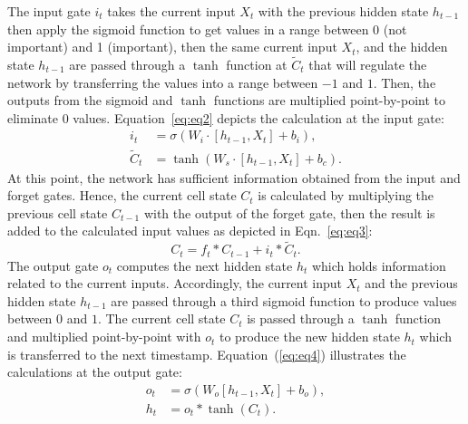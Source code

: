The input gate \(i_{t}\) takes the current input \(X_t\) with the previous hidden state \(h_{t-1}\) then apply the sigmoid function to get values in a range between 0 (not important) and 1 (important), then the
same current input \(X_t\), and the hidden state \(h_{t-1}\) are passed through a \(\tanh\) function at \(\tilde{C}_{t}\) that will regulate the network by transferring the values into a range between \(-1\) and \(1\).
Then, the outputs from the sigmoid and \(\tanh\) functions are multiplied point-by-point to eliminate \(0\) values.  
Equation~\ref{eq:eq2} depicts the calculation at the input gate:
\begin{equation}
	\begin{aligned}
		i_{t} &=\sigma\left(W_{i} \cdot\left[h_{t-1}, X_{t}\right]+b_{i}\right) ,
		\\
		\tilde{C}_{t} &=\tanh \left(W_{s} \cdot\left[h_{t-1}, X_{t}\right]+b_{c}\right).
	\end{aligned} \label{eq:eq2}
\end{equation}
At this point, the network has sufficient information obtained from the input and forget gates. 
Hence, the current cell state \(C_t\) is calculated by multiplying the previous cell state \(C_{t-1}\) with the output of the forget gate, then the result is added to the calculated input values as depicted in Eqn.~\ref{eq:eq3}:
\begin{equation}
	C_{t}=f_{t} * C_{t-1}+i_{t} * \tilde{C}_{t}.
	\label{eq:eq3}
\end{equation}
The output gate \(o_{t}\) computes the next hidden state \(h_{t}\) which
holds information related to the current inputs. 
Accordingly, the current input \(X_{t}\) and the previous hidden state \(h_{t-1}\) are passed through a third sigmoid function to produce values between \(0\) and \(1\).
The current cell state \(C_{t}\) is passed through a \(\tanh\) function and multiplied point-by-point with \(o_{t}\) to produce the new hidden state \(h_{t}\) which is transferred to the next timestamp.
Equation~(\ref{eq:eq4}) illustrates the calculations at the output gate:
\begin{equation}
	\begin{aligned}
		o_{t} &=\sigma\left(W_{o}\left[h_{t-1}, X_{t}\right]+b_{o}\right),\\
		h_{t} &=o_{t} * \tanh \left(C_{t}\right).
	\end{aligned}
	\label{eq:eq4}
\end{equation} 

